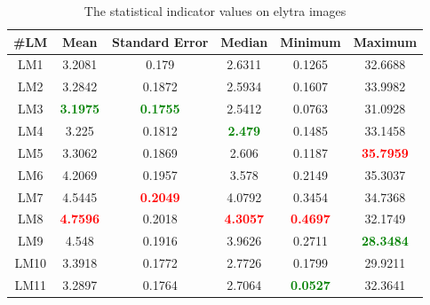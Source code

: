 \documentclass[review]{elsarticle}
\begin{document}
\begin{table}[htbp]
	\begin{tabular}{ | c | c | c | c | c | c | }
\hline
	 \textbf{\#LM} & \textbf{Mean} & \textbf{Standard Error} & \textbf{Median} & \textbf{Minimum} & \textbf{Maximum} \\ \hline
	LM1 & 3.2081 & 0.179 & 2.6311 & 0.1265 & 32.6688 \\ \hline
	LM2 & 3.2842 & 0.1872 & 2.5934 & 0.1607 & 33.9982 \\ \hline
	LM3 & \textcolor{green}{\textbf{3.1975}} & \textcolor{green}{\textbf{0.1755}} & 2.5412 & 0.0763 & 31.0928 \\ \hline
	LM4 & 3.225 & 0.1812 & \textcolor{green}{\textbf{2.479}} & 0.1485 & 33.1458 \\ \hline
	LM5 & 3.3062 & 0.1869 & 2.606 & 0.1187 & \textcolor{red}{\textbf{35.7959}} \\ \hline
	LM6 & 4.2069 & 0.1957 & 3.578 & 0.2149 & 35.3037 \\ \hline
	LM7 & 4.5445 & \textcolor{red}{\textbf{0.2049}} & 4.0792 & 0.3454 & 34.7368 \\ \hline
	LM8 & \textcolor{red}{\textbf{4.7596}} & 0.2018 & \textcolor{red}{\textbf{4.3057}} & \textcolor{red}{\textbf{0.4697}} & 32.1749 \\ \hline
	LM9 & 4.548 & 0.1916 & 3.9626 & 0.2711 & \textcolor{green}{\textbf{28.3484}} \\ \hline
	LM10 & 3.3918 & 0.1772 & 2.7726 & 0.1799 & 29.9211 \\ \hline
	LM11 & 3.2897 & 0.1764 & 2.7064 & \textcolor{green}{\textbf{0.0527}} & 32.3641 \\ \hline
\end{tabular}
\caption{The statistical indicator values on elytra images}
\label{a3}
\end{table}

\pagebreak
\end{document}
